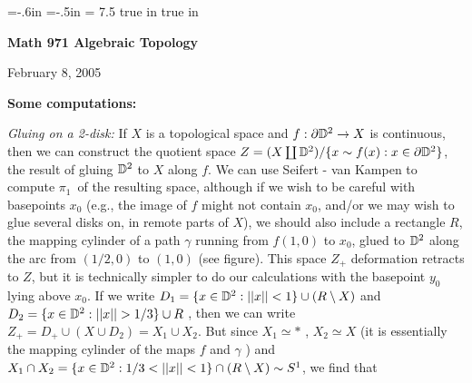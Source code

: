 

\overfullrule=0pt
\parindent=0pt

\nopagenumbers



\voffset=-.6in
\hoffset=-.5in
\hsize = 7.5 true in
 true in




\loadmsbm



\def\ctln{\centerline}
\def\u{\underbar}
\def\ssk{\smallskip}
\def\msk{\medskip}
\def\bsk{\bigskip}
\def\hsk{\hskip.1in}
\def\hhsk{\hskip.2in}
\def\dsl{\displaystyle}
\def\hskp{\hskip1.5in}

\def\lra{$\Leftrightarrow$ }
\def\ra{\rightarrow}
\def\mpto{\logmapsto}
\def\pu{\pi_1}
\def\mpu{$\pi_1$}
\def\sig{\Sigma}
\def\msig{$\Sigma$}
\def\ep{\epsilon}
\def\sset{\subseteq}
\def\del{\partial}
\def\inv{^{-1}}
\def\wtl{\widetilde}



\ctln{\bf Math 971 Algebraic Topology}

\ssk

\ctln{February 8, 2005}

\msk

{\bf Some computations:}

\msk

{\it Gluing on a 2-disk:} If $X$ is a topological 
space and $f:\del {\Bbb D}^2\ra X$ is continuous, then we
can construct the quotient space $Z=(X\coprod 
{\Bbb D}^2)/\{x\sim f(x) : x\in\del{\Bbb D}^2\}$,
the result of gluing ${\Bbb D}^2$ to $X$ along $f$. 
We can use Seifert - van Kampen to compute \mpu\ 
of the resulting space, although if we
wish to be careful with basepoints $x_0$ 
(e.g., the image of $f$ might not contain $x_0$, and/or we
may wish to glue several disks on, in remote parts of $X$),
we should also include a rectangle $R$, the mapping 
cylinder of a path $\gamma$ running from 
$f(1,0)$ to $x_0$, glued to 
${\Bbb D}^2$ along the arc from $(1/2,0)$ to $(1,0)$ (see figure). 
This space $Z_+$ deformation retracts to $Z$, but it
is technically simpler to do our calculations 
with the basepoint $y_0$ lying above $x_0$.
If we write $D_1 = \{x\in {\Bbb D}^2 : ||x||<1\}\cup(R\setminus X)$ 
and $D_2 = \{x\in {\Bbb D}^2 : ||x||>1/3\}\cup R$ , 
then we can write $Z_+=D_+\cup(X\cup D_2) = X_1\cup X_2$.
But since $X_1\simeq *$ , $X_2\simeq X$ 
(it is essentially the mapping cylinder of 
the maps $f$ and $\gamma$ )
and $X_1\cap X_2 = \{x\in {\Bbb D}^2 : 
1/3<||x||<1\}\cap(R\setminus X)\sim S^1$, we find that 

